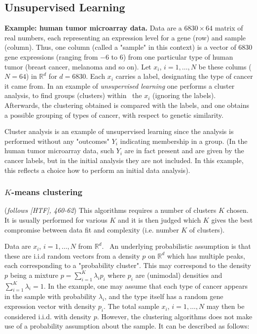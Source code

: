 \documentclass[11pt,twoside]{article}%
\theoremstyle{change}
\begin{document}
\subsection{Unsupervised Learning}

\textbf{Example: human tumor microarray data.} Data are a $6830\times64$
matrix of real numbers, each representing an expression level for a gene (row)
and sample (column). Thus, one column (called a "sample" in this context) is a
vector of $6830$ gene expressions (ranging from $-6$ to $6$) from one
particular type of human tumor (breast cancer, melanoma and so on). Let
$x_{i}$, $i=1,\ldots,N$ be these colums ($N=64$) in $\mathbb{R}^{d}$ for
$d=6830$. Each $x_{i}$ carries a label, designating the type of cancer it came
from. In an example of \textit{unsupervised learning} one performs a cluster
analysis, to find groups (clusters) within \ the $x_{i}$ (ignoring the
labels). Afterwards, the clustering obtained is compared with the labels, and
one obtains a possible grouping of types of cancer, with respect to genetic similarity.

Cluster analysis is an example of unsupervised learning since the analysis is
performed without any "outcomes" $Y_{i}$ indicating membership in a group. (In
the human tumor microarray data, such $Y_{i}$ are in fact present and are
given by the cancer labels, but in the initial analysis they are not included.
In this example, this reflects a choice how to perform an initial data analysis).

\subsubsection{$K$-means clustering}

(\textit{follows [HTF], 460-62}) This algorithms requires a number of clusters
$K$ chosen. It is usually performed for various $K$ and it is then judged
which $K$ gives the best compromise between data fit and complexity (i.e.
number $K$ of clusters).

Data are $x_{i}$, $i=1,\ldots,N$ from $\mathbb{R}^{d}$. \ An underlying
probabilistic assumption is that these are i.i.d random vectors from a density
$p$ on $\mathbb{R}^{d}$ which has multiple peaks, each corresponding to a
"probability cluster". This may correspond to the density $p$ being a mixture
$p=\sum_{i=1}^{K}\lambda_{i}p_{i}$ where $p_{i}$ are (unimodal) densities and
$\sum_{i=1}^{K}\lambda_{i}=1$. In the example, one may assume that each type
of cancer appears in the sample with probability $\lambda_{i} $, and the type
itself has a random gene expression vector with density $p_{i}$. The total
sample $x_{i}$, $i=1,\ldots,N$ may then be considered i.i.d. with density $p$.
However, the clustering algorithms does not make use of a probability
assumption about the sample. It can be described as follows:
\end{document}
